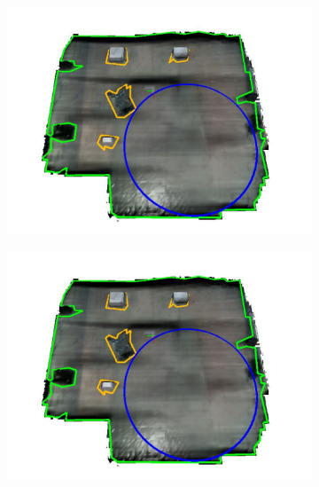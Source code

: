 \begin{figure}[!htb]
  \centering
  \begin{subfigure}[t]{.30\linewidth}
    \centering  \includegraphics[page=1,clip,trim=2cm 0cm 2cm 0cm,width=.99\linewidth]{chapter_7_experiments/imgs/mesh_man_all.pdf}
    \caption{\label{fig:ch7_mesh_a}}
  \end{subfigure}
  \begin{subfigure}[t]{.30\linewidth}
    \centering  \includegraphics[page=2,clip,trim=2cm 0cm 2cm 0cm,width=.99\linewidth]{chapter_7_experiments/imgs/mesh_man_all.pdf}
    \caption{\label{fig:ch7_mesh_b}}
  \end{subfigure}
  

\end{figure}

